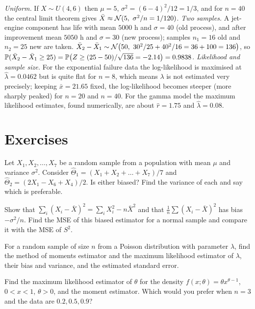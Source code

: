 \begin{example}
\emph{Uniform.} If $X\sim U(4,6)$ then $\mu=5$, $\sigma^2=(6-4)^2/12=1/3$, and for $n=40$ the central limit theorem gives $\bar{X}\approx\Normal(5,\ \sigma^2/n=1/120)$.
\emph{Two samples.} A jet-engine component has life with mean $5000$ h and $\sigma=40$ (old process), and after improvement mean $5050$ h and $\sigma=30$ (new process); samples $n_1=16$ old and $n_2=25$ new are taken. $\bar{X}_2-\bar{X}_1\sim\Normal\big(50,\ 30^2/25+40^2/16=36+100=136\big)$, so $\mathbb{P}(\bar{X}_2-\bar{X}_1\ge25)=\mathbb{P}\big(Z\ge(25-50)/\sqrt{136}=-2.14\big)=0.9838$.
\emph{Likelihood and sample size.} For the exponential failure data the log-likelihood is maximised at $\hat\lambda=0.0462$ but is quite flat for $n=8$, which means $\lambda$ is not estimated very precisely; keeping $\bar{x}=21.65$ fixed, the log-likelihood becomes steeper (more sharply peaked) for $n=20$ and $n=40$. For the gamma model the maximum likelihood estimates, found numerically, are about $\hat{r}=1.75$ and $\hat\lambda=0.08$.
\end{example}

\section{Exercises}

\begin{exercise}
Let $X_1,X_2,\dots,X_7$ be a random sample from a population with mean $\mu$ and variance $\sigma^2$. Consider $\hat\Theta_1=(X_1+X_2+\dots+X_7)/7$ and $\hat\Theta_2=(2X_1-X_6+X_4)/2$. Is either biased? Find the variance of each and say which is preferable.
\end{exercise}

\begin{exercise}
Show that $\sum_{i}(X_i-\bar{X})^2=\sum_i X_i^2-n\bar{X}^2$ and that $\frac1n\sum(X_i-\bar{X})^2$ has bias $-\sigma^2/n$. Find the MSE of this biased estimator for a normal sample and compare it with the MSE of $S^2$.
\end{exercise}

\begin{exercise}
For a random sample of size $n$ from a Poisson distribution with parameter $\lambda$, find the method of moments estimator and the maximum likelihood estimator of $\lambda$, their bias and variance, and the estimated standard error.
\end{exercise}

\begin{exercise}
Find the maximum likelihood estimator of $\theta$ for the density $f(x;\theta)=\theta x^{\theta-1}$, $0<x<1$, $\theta>0$, and the moment estimator. Which would you prefer when $n=3$ and the data are $0.2,0.5,0.9$?
\end{exercise}

